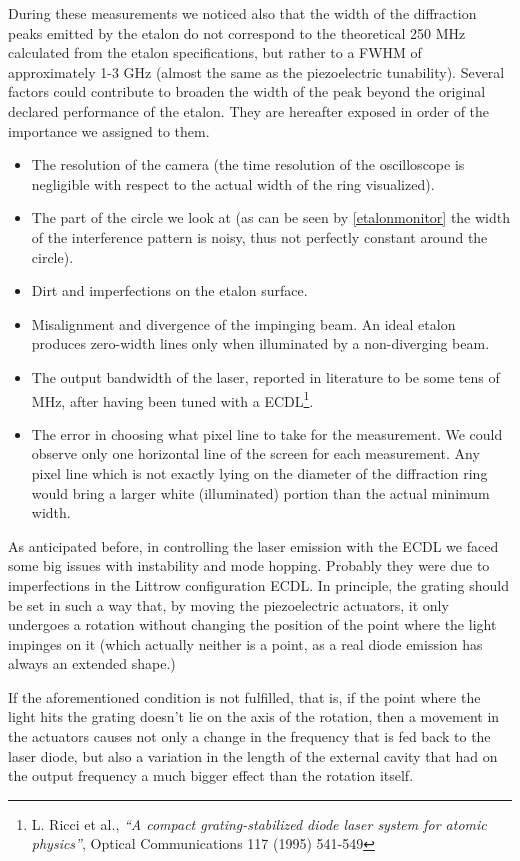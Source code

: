 \medskip
During these measurements we noticed also that the width of the diffraction peaks emitted by the etalon do not correspond to the theoretical 250 MHz calculated from the etalon specifications, but rather to a FWHM of approximately 1-3 GHz (almost the same as the piezoelectric tunability). Several factors could contribute to broaden the width of the peak beyond the original declared performance of the etalon. They are hereafter exposed in order of the importance we assigned to them.
\begin{itemize}
\item The resolution of the camera (the time resolution of the oscilloscope is negligible with respect to the actual width of the ring visualized).
\item The part of the circle we look at (as can be seen by \cref{etalonmonitor} the width of the interference pattern is noisy, thus not perfectly constant around the circle).
\item Dirt and imperfections on the etalon surface.
\item Misalignment and divergence of the impinging beam. An ideal etalon produces zero-width lines only when illuminated by a non-diverging beam.
\item The output bandwidth of the laser, reported in literature to be some tens of MHz, after having been tuned with a ECDL\footnote{L. Ricci et al., \textit{\textquotedblleft A compact grating-stabilized diode laser system for atomic physics\textquotedblright}, Optical Communications 117 (1995) 541-549}.
\item The error in choosing what pixel line to take for the measurement. We could observe only one horizontal line of the screen for each measurement. Any pixel line which is not exactly lying on the diameter of the diffraction ring would bring a larger white (illuminated) portion than the actual minimum width.
\end{itemize}
As anticipated before, in controlling the laser emission with the ECDL we faced some big issues with instability and mode hopping. Probably they were due to imperfections in the Littrow configuration ECDL. In principle, the grating should be set in such a way that, by moving the piezoelectric actuators, it only undergoes a rotation without changing the position of the point where the light impinges on it (which actually neither is a point, as a real diode emission has always an extended shape.)

If the aforementioned condition is not fulfilled, that is, if the point where the light hits the grating doesn't lie on the axis of the rotation, then a movement in the actuators causes not only a change in the frequency that is fed back to the laser diode, but also a variation in the length of the external cavity that had on the output frequency a much bigger effect than the rotation itself.